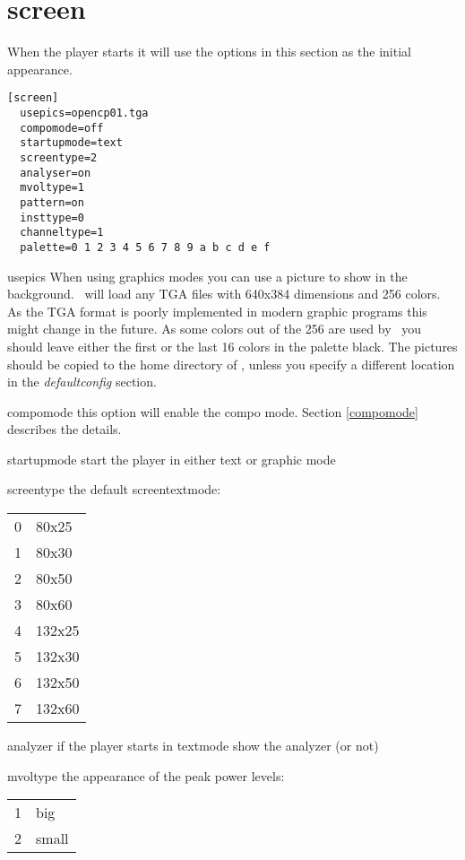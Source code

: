 \section{screen}
When the player starts it will use the options in this section as the
initial appearance.

\begin{verbatim}
[screen] 
  usepics=opencp01.tga
  compomode=off  
  startupmode=text 
  screentype=2    
  analyser=on
  mvoltype=1
  pattern=on
  insttype=0
  channeltype=1
  palette=0 1 2 3 4 5 6 7 8 9 a b c d e f
\end{verbatim}

\begin{dojlist}
\item[usepics] When using graphics modes you can use a picture to show in the
background. \cp\ will load any TGA files with 640x384 dimensions and
256 colors.  As the TGA format is poorly implemented in modern graphic
programs this might change in the future. As some colors out of the
256 are used by \cp\ you should leave either the first or the last 16
colors in the palette black.  The pictures should be copied to the
home directory of \cp, unless you specify a different location in the
\emph{defaultconfig} section.
\item[compomode] this option will enable the compo mode. Section 
\ref{compomode} describes the details.
\item[startupmode] start the player in either text or graphic mode
\item[screentype] the default screentextmode: \\
  \begin{tabular}{l@{ -- }l}
  0 & 80x25 \\
  1 & 80x30 \\
  2 & 80x50 \\
  3 & 80x60 \\
  4 & 132x25 \\
  5 & 132x30 \\
  6 & 132x50 \\
  7 & 132x60 \\
  \end{tabular}
\item[analyzer] if the player starts in textmode show the analyzer (or not)
\item[mvoltype] the appearance of the peak power levels: \\
  \begin{tabular}{l@{ -- }l} 1 & big \\ 2 & small \\ \end{tabular}

\end{dojlist}
